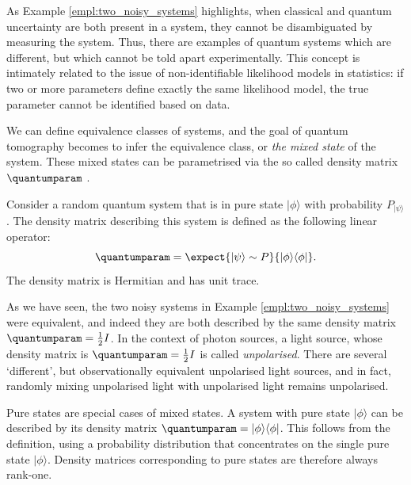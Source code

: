 As Example \ref{empl:two_noisy_systems} highlights, when classical and quantum uncertainty are both present in a system, they cannot be disambiguated by measuring the system. Thus, there are examples of quantum systems which are different, but which cannot be told apart experimentally. This concept is intimately related to the issue of non-identifiable likelihood models \citep{Teicher1961} in statistics: if two or more parameters define exactly the same likelihood model, the true parameter cannot be identified based on data.

We can define equivalence classes of systems, and the goal of quantum tomography becomes to infer the equivalence class, or \emph{the mixed state} of the system. These mixed states can be parametrised via the so called density matrix $\quantumparam$ \citep{Fano1957}.

\begin{definition}
Consider a random quantum system that is in pure state $\vert\phi\rangle$ with probability $P_{\vert\psi\rangle}$. The density matrix describing this system is defined as the following linear operator:
%
\begin{equation}
	\quantumparam = \expect{\vert\psi\rangle\sim P}{\vert\phi\rangle\langle\phi\vert}.
\end{equation}
%
The density matrix is Hermitian and has unit trace.
\end{definition}

As we have seen, the two noisy systems in Example \ref{empl:two_noisy_systems} were equivalent, and indeed they are both described by the same density matrix $\quantumparam=\frac{1}{2}I$. In the context of photon sources, a light source, whose density matrix is $\quantumparam=\frac{1}{2}I$ is called \emph{unpolarised}. There are several `different', but observationally equivalent unpolarised light sources, and in fact, randomly mixing unpolarised light with unpolarised light remains unpolarised.

Pure states are special cases of mixed states. A system with pure state $\vert \phi \rangle$ can be described by its density matrix $\quantumparam = \vert \phi \rangle \langle \phi \vert$. This follows from the definition, using a probability distribution that concentrates on the single pure state $\vert \phi \rangle$. Density matrices corresponding to pure states are therefore always rank-one.

